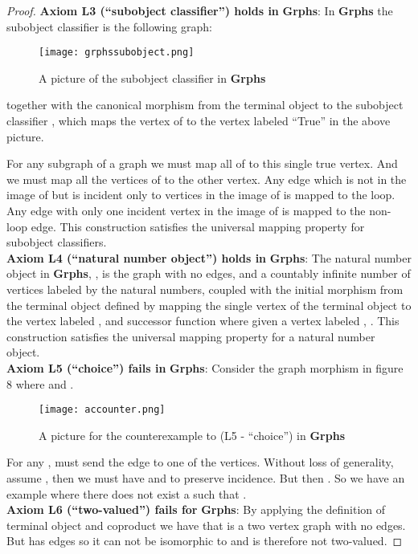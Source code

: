 \documentclass[11pt]{article}
\begin{document}
\begin{proof}
\textbf{Axiom L3 (``subobject classifier'') holds in} \textbf{Grphs}: In \textbf{Grphs} the subobject classifier is the following graph:\par
\begin{figure}[h]
\begin{center}
\texttt{[image: grphssubobject.png]}
\end{center}
\caption{A picture of the subobject classifier  in \textbf{Grphs}}
\end{figure}
together with the canonical morphism  from the terminal object  to the subobject classifier , which maps the vertex of  to the vertex labeled ``True'' in the above picture.\par
For any subgraph  of a graph  we must map all of  to this single true vertex. And we must map all the vertices of  to the other vertex. Any edge which is not in the image of  but is incident only to vertices in the image of  is mapped to the loop. Any edge with only one incident vertex in the image of  is mapped to the non-loop edge. This construction satisfies the universal mapping property for subobject classifiers.\\
\indent \textbf{Axiom L4 (``natural number object'') holds in} \textbf{Grphs}: The natural number object in \textbf{Grphs}, , is the graph with no edges, and a countably infinite number of vertices labeled by the natural numbers, coupled with the initial morphism  from the terminal object  defined by mapping the single vertex of the terminal object to the vertex labeled , and successor function  where given a vertex labeled , . This construction satisfies the universal mapping property for a natural number object.\\

\indent \textbf{Axiom L5 (``choice'') fails in} \textbf{Grphs}: Consider the graph morphism in figure 8 where  and .\par
\begin{figure}[h]
\begin{center}
\texttt{[image: accounter.png]}
\end{center}
\caption{A picture for the counterexample to (L5 - ``choice'') in \textbf{Grphs}}
\end{figure}
For any ,  must send the edge  to one of the vertices. Without loss of generality, assume , then we must have  and  to preserve incidence. But then . So we have an example where there does not exist a  such that .\\
\indent \textbf{Axiom L6 (``two-valued'') fails for} \textbf{Grphs}: By applying the definition of terminal object and coproduct we have that  is a two vertex graph with no edges. But  has edges so it can not be isomorphic to  and is therefore not two-valued.
\end{proof}
\end{document}
